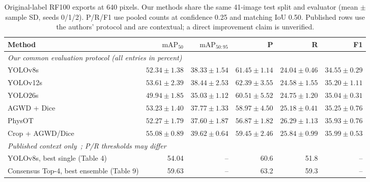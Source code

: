 \begin{table}[!t]
\centering
\caption{Original-label RF100 exports at 640 pixels. Our methods share the same 41-image test split and evaluator (mean $\pm$ sample SD, seeds 0/1/2). P/R/F1 use pooled counts at confidence 0.25 and matching IoU 0.50. Published rows use the authors' protocol and are contextual; a direct improvement claim is unverified.}
\label{tab:paper}\small\setlength{\tabcolsep}{4pt}
\begin{tabular}{lrrrrr}\toprule
Method & $\mathrm{mAP}_{50}$ & $\mathrm{mAP}_{50:95}$ & P & R & F1\\\midrule
\multicolumn{6}{l}{\emph{Our common evaluation protocol (all entries in percent)}}\\
YOLOv8s & $52.34\pm1.38$ & $38.33\pm1.54$ & $61.45\pm1.14$ & $24.04\pm0.46$ & $34.55\pm0.29$ \\
YOLOv12s & $53.61\pm2.39$ & $38.44\pm2.53$ & $62.39\pm3.55$ & $24.58\pm1.55$ & $35.20\pm1.11$ \\
YOLO26s & $49.94\pm1.85$ & $35.03\pm1.12$ & $60.51\pm5.52$ & $24.75\pm1.20$ & $35.04\pm0.31$ \\
AGWD + Dice & $53.23\pm1.40$ & $37.77\pm1.33$ & $58.97\pm4.50$ & $25.18\pm0.41$ & $35.25\pm0.76$ \\
PhysOT & $52.27\pm1.79$ & $37.60\pm1.87$ & $56.87\pm1.82$ & $26.29\pm1.13$ & $35.93\pm0.76$ \\
Crop + AGWD/Dice & $55.08\pm0.89$ & $39.62\pm0.64$ & $59.45\pm2.46$ & $25.84\pm0.99$ & $35.99\pm0.53$ \\
\midrule
\multicolumn{6}{l}{\emph{Published context only~\cite{zhou2026ensemble}; P/R thresholds may differ}}\\
YOLOv8s, best single (Table 4) & 54.04 & -- & 60.6 & 51.8 & --\\
Consensus Top-4, best ensemble (Table 9) & 59.63 & -- & 63.2 & 59.3 & --\\
\bottomrule\end{tabular}\end{table}
